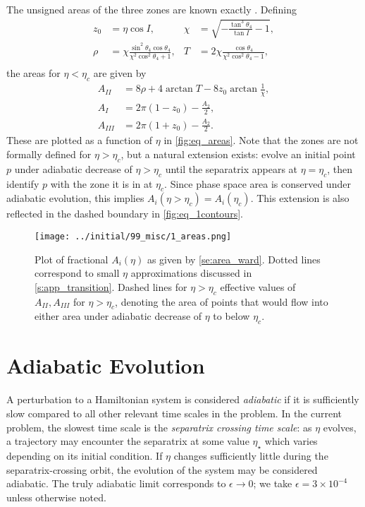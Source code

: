 \documentclass[
        fleqn,
        usenatbib,
    ]{mnras}
\newcommand*{\p}[1]{\left(#1\right)}
\begin{document}
The unsigned areas of the three zones are known exactly
\citep{henrard1987,ward2004I}. Defining
\begin{align*}
    z_0 &= \eta\cos I, &
    \chi &= \sqrt{-\frac{\tan^3\theta_4}{\tan I} - 1},\\
    \rho &= \chi \frac{\sin^2 \theta_4\cos \theta_4}{
        \chi^2 \cos^2\theta_4 + 1},&
    T &= 2\chi \frac{\cos \theta_4}{
        \chi^2 \cos^2\theta_4 - 1},\\
\end{align*}
the areas for $\eta < \eta_c$ are given by
\begin{subequations}\label{se:area_ward}
    \begin{align}
        A_{II} &= 8\rho + 4\arctan T - 8z_0 \arctan \frac{1}{\chi},\\
        A_I &= 2\pi\p{1 - z_0} - \frac{A_2}{2},\\
        A_{III} &= 2\pi\p{1 + z_0} - \frac{A_2}{2}.
    \end{align}
\end{subequations}
These are plotted as a function of $\eta$ in \autoref{fig:eq_areas}. Note that
the zones are not formally defined for $\eta > \eta_c$, but a natural extension
exists: evolve an initial point $p$ under adiabatic decrease of $\eta > \eta_c$
until the separatrix appears at $\eta = \eta_c$, then identify $p$ with the zone
it is in at $\eta_c$. Since phase space area is conserved under adiabatic
evolution, this implies $A_i\p{\eta > \eta_c} = A_i(\eta_c)$. This extension is
also reflected in the dashed boundary in \autoref{fig:eq_1contours}.
\begin{figure}
    \centering
    \texttt{[image: ../initial/99\_misc/1\_areas.png]}
    \caption{Plot of fractional $A_{i}(\eta)$ as given by
    \autoref{se:area_ward}. Dotted lines correspond to small $\eta$
    approximations discussed in \autoref{s:app_transition}. Dashed lines for
    $\eta > \eta_c$ effective values of $A_{II}, A_{III}$ for $\eta > \eta_c$,
    denoting the area of points that would flow into either area under adiabatic
    decrease of $\eta$ to below $\eta_c$.}\label{fig:eq_areas}
\end{figure}

\section{Adiabatic Evolution}\label{s:ad}

A perturbation to a Hamiltonian system is considered \emph{adiabatic} if it is
sufficiently slow compared to all other relevant time scales in the problem.
In the current problem, the slowest time scale is the \emph{separatrix crossing
time scale}: as $\eta$ evolves, a trajectory may encounter the separatrix at
some value $\eta_\star$ which varies depending on its initial condition. If
$\eta$ changes sufficiently little during the separatrix-crossing orbit, the
evolution of the system may be considered adiabatic. The truly adiabatic limit
corresponds to $\epsilon \to 0$; we take $\epsilon = 3 \times 10^{-4}$ unless
otherwise noted.
\end{document}
